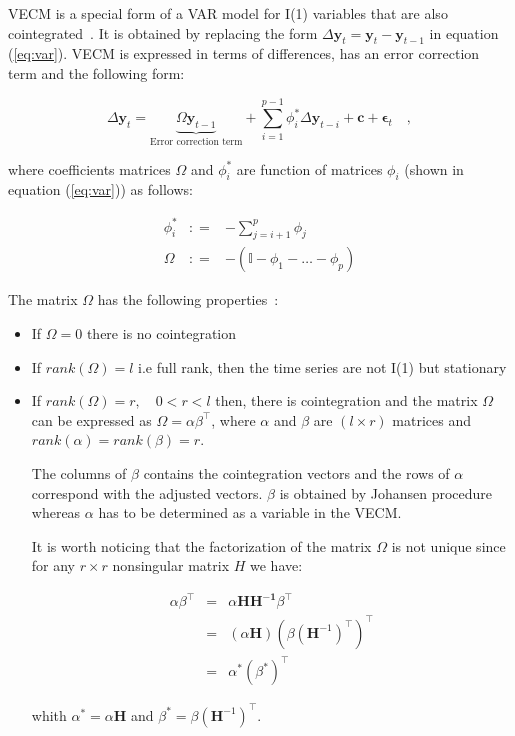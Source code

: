 VECM is a special form of a VAR model for I(1) variables that are also
cointegrated~\cite{banerjee1993}. It is obtained by replacing the form $\Delta
\mathbf{y}_t = \mathbf{y}_t - \mathbf{y}_{t-1}$ in equation (\ref{eq:var}).
VECM is expressed in terms of differences, has an error correction term and 
the following form:

\begin{equation}
 \label{eq:vec}
 \Delta \mathbf{y}_t = 
 \underbrace{ \Omega\mathbf{y}_{t-1}}_\text{Error correction term} + 
 \sum_{i=1}^{p-1}
\phi_i^* \Delta \mathbf{y}_{t-i}  + \mathbf{c} + \mathbf{\epsilon}_t \quad ,
\end{equation}

\noindent where coefficients matrices $\Omega$ and $\phi_i^*$ are
function of matrices $\phi_i$ (shown in equation (\ref{eq:var})) as follows:

\begin{eqnarray*}
\phi_i^* &: =& -\sum_{j=i+1}^{p} \phi_j \\
\Omega &: =& -(\mathbb{I}-\phi_1-\dots-\phi_p) 
\end{eqnarray*}

The matrix $\Omega$ has the following properties~\cite{johansen1995}:
\begin{itemize}
\item If $\Omega = 0$ there is no cointegration
\item If $rank(\Omega)=l$ i.e full rank, then the time series are not
I(1) but stationary
\item If $rank(\Omega)=r,\quad 0 < r < l$ then, there is cointegration
and the matrix $\Omega$ can be expressed as $\Omega =
\alpha \beta^\top$, where $\alpha$ and $\beta$ are $(l \times r)$
matrices and $rank(\alpha)=rank(\beta)=r$.

The columns of $\beta$ contains the cointegration vectors and the rows of
$\alpha$ correspond with the adjusted vectors. $\beta$ is obtained by Johansen
procedure~\cite{johansen1988} whereas $\alpha$ has to be determined as a
variable in the VECM.

It is worth noticing that the factorization of the matrix $\Omega$ is not
unique since for any $r \times r$ nonsingular matrix $H$ we have:

\begin{eqnarray*}
\alpha \beta^\top &=& \alpha \mathbf{HH^{-1}} \beta^\top\\
&=&(\alpha\mathbf{H})(\beta(\mathbf{H}^{-1})^\top)^\top \\
&=& \alpha^*(\beta^*)^\top
\end{eqnarray*}

\noindent whith $\alpha^* = \alpha\mathbf{H}$ and $\beta^* =
\beta(\mathbf{H}^{-1})^\top$.


\end{itemize}

